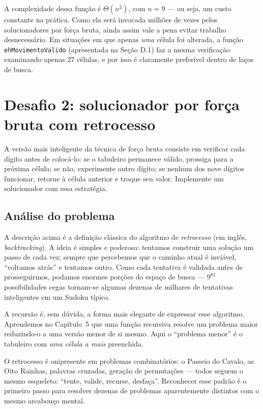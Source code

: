 \documentclass[11pt,a4paper,oneside]{report}
\newcommand{\codigo}[1]{\texttt{\color{deitelblue}#1}}
\begin{document}
\begin{desempenho}
A complexidade dessa função é $\Theta(n^2)$, com $n = 9$ --- ou seja, um
custo constante na prática. Como ela será invocada milhões de vezes pelos
solucionadores por força bruta, ainda assim vale a pena evitar trabalho
desnecessário. Em situações em que apenas \emph{uma} célula foi alterada,
a função \codigo{ehMovimentoValido} (apresentada na Seção D.1) faz a mesma
verificação examinando apenas $27$ células, e por isso é claramente
preferível dentro de laços de busca.
\end{desempenho}

\section{Desafio 2: solucionador por força bruta com retrocesso}

\begin{enunciado}
A versão mais inteligente da técnica de força bruta consiste em verificar
cada dígito antes de colocá-lo: se o tabuleiro permanece válido, prossiga
para a próxima célula; se não, experimente outro dígito; se nenhum dos nove
dígitos funcionar, retorne à célula anterior e troque seu valor. Implemente
um solucionador com essa estratégia.
\end{enunciado}

\subsection{Análise do problema}

A descrição acima é a definição clássica do algoritmo de \emph{retrocesso}
(em inglês, \textit{backtracking}). A ideia é simples e poderosa: tentamos
construir uma solução um passo de cada vez; sempre que percebemos que o
caminho atual é inviável, ``voltamos atrás'' e tentamos outro. Como cada
tentativa é validada antes de prosseguirmos, podamos enormes porções do
espaço de busca --- $9^{81}$ possibilidades cegas tornam-se algumas dezenas
de milhares de tentativas inteligentes em um Sudoku típico.

A recursão é, sem dúvida, a forma mais elegante de expressar esse algoritmo.
Aprendemos no Capítulo~5 que uma função recursiva resolve um problema
maior reduzindo-o a uma versão menor de si mesmo. Aqui o ``problema menor''
é o tabuleiro com \emph{uma célula a mais} preenchida.

\begin{engenharia}
O retrocesso é onipresente em problemas combinatórios: o Passeio do Cavalo,
as Oito Rainhas, palavras cruzadas, geração de permutações --- todos seguem
o mesmo esqueleto: ``tente, valide, recurse, desfaça''. Reconhecer esse
padrão é o primeiro passo para resolver dezenas de problemas aparentemente
distintos com o mesmo arcabouço mental.
\end{engenharia}
\end{document}
